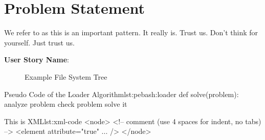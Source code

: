 \section{Problem Statement}

\lipsum[9]

We refer to \patternOneReference as this is an important pattern. It really is. Trust us. Don't think for yourself. Just trust us.

\lipsum[10]

\begin{mdframed}[backgroundcolor=black!20,rightline=false,leftline=false,topline=false,bottomline=false]
\begin{description}
\item[\textbf{User Story Name}:]
\end{description}
\end{mdframed}

\lipsum[11]

\begin{figure}[htb]
\centering
\footnotesize
\caption{Example File System Tree}\label{fig:example-file-system-tree}
\end{figure}

\lipsum[12]

\begin{pseudoCode}{Pseudo Code of the Loader Algorithm}{lst:pebash:loader}
def solve(problem):
    analyze problem
    check problem
    solve it
\end{pseudoCode}

\lipsum[13]

\begin{xmlCode}{This is XML}{lst:xml-code}
<node>
    <!-- comment (use 4 spaces for indent, no tabs) -->
    <element attribute="true" ... />
</node>
\end{xmlCode}

\lipsum[13]

